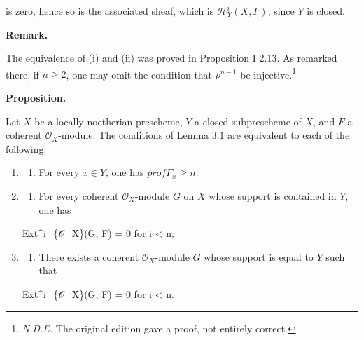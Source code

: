 \documentclass[
  11pt,
  a4paper,
]{book}
\newenvironment{Shaded}{}{}
\newcommand{\NormalTok}[1]{#1}
\providecommand{\tightlist}{%
  \setlength{\itemsep}{0pt}\setlength{\parskip}{0pt}}
\begin{document}
is zero, hence so is the associated sheaf, which is
\(\mathcal{H}^{i}_{Y}(X, F)\), since \(Y\) is closed.

\textbf{Remark.}

The equivalence of (i) and (ii) was proved in Proposition I 2.13. As
remarked there, if \(n \geqslant 2\), one may omit the condition that
\(\rho^{n-1}\) be injective.\footnote{\emph{N.D.E.} The original edition
  gave a proof, not entirely correct.}

\textbf{Proposition.}

Let \(X\) be a locally noetherian prescheme, \(Y\) a closed subprescheme
of \(X\), and \(F\) a coherent \(\mathcal{O}_{X}\)-module. The
conditions of Lemma 3.1 are equivalent to each of the following:

\begin{enumerate}
\def\labelenumi{\arabic{enumi}.}
\item
  \begin{enumerate}
  \def\labelenumii{(\roman{enumii})}
  \setcounter{enumii}{3}
  \tightlist
  \item
    For every \(x \in Y\), one has \(prof F_{x} \geqslant n\).
  \end{enumerate}
\item
  \begin{enumerate}
  \def\labelenumii{(\alph{enumii})}
  \setcounter{enumii}{21}
  \tightlist
  \item
    For every coherent \(\mathcal{O}_{X}\)-module \(G\) on \(X\) whose
    support is contained in \(Y\), one has
  \end{enumerate}

\begin{Shaded}
\begin{Highlighting}[]
\NormalTok{Ext\^{}i\_\{𝒪\_X\}(G, F) = 0 for i \textless{} n;}
\end{Highlighting}
\end{Shaded}
\item
  \begin{enumerate}
  \def\labelenumii{(\roman{enumii})}
  \setcounter{enumii}{5}
  \tightlist
  \item
    There exists a coherent \(\mathcal{O}_{X}\)-module \(G\) whose
    support is equal to \(Y\) such that
  \end{enumerate}

\begin{Shaded}
\begin{Highlighting}[]
\NormalTok{Ext\^{}i\_\{𝒪\_X\}(G, F) = 0 for i \textless{} n.}
\end{Highlighting}
\end{Shaded}
\end{enumerate}
\end{document}
